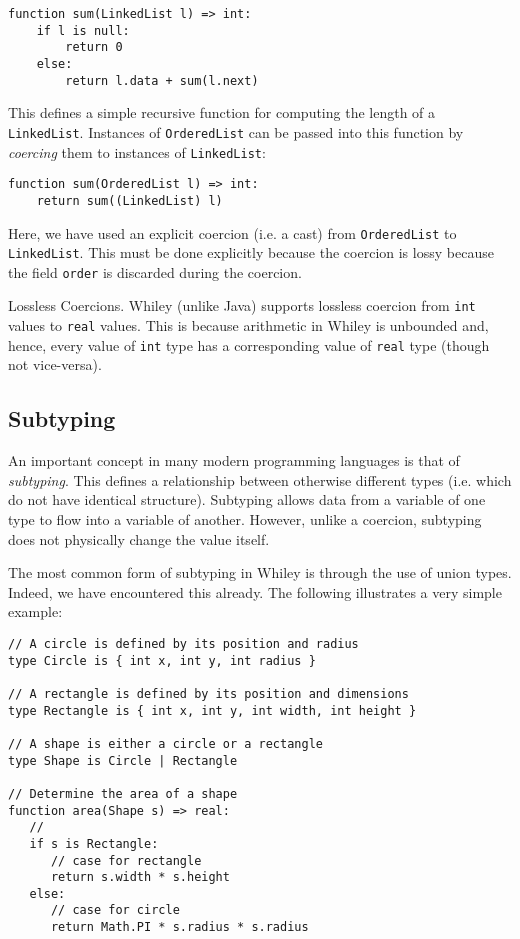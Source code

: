 \begin{lstlisting}
function sum(LinkedList l) => int:
    if l is null:
        return 0
    else:
        return l.data + sum(l.next)
\end{lstlisting}

This defines a simple recursive function for computing the length of a \lstinline{LinkedList}.  Instances of \lstinline{OrderedList} can be passed into this function by {\em coercing} them to instances of \lstinline{LinkedList}:

\begin{lstlisting}
function sum(OrderedList l) => int:
    return sum((LinkedList) l)
\end{lstlisting}

Here, we have used an explicit coercion (i.e. a cast) from \lstinline{OrderedList} to \lstinline{LinkedList}.  This must be done explicitly because the coercion is lossy because the field \lstinline{order} is discarded during the coercion.

\begin{insight}{Lossless Coercions.}
Whiley (unlike Java) supports lossless coercion from \lstinline{int} values to \lstinline{real} values.  This is because arithmetic in Whiley is unbounded and, hence, every value of \lstinline{int} type has a corresponding value of \lstinline{real} type (though not vice-versa).
\end{insight}

\subsection{Subtyping}

An important concept in many modern programming languages is that of {\em subtyping}.  This defines a relationship between otherwise different types (i.e. which do not have identical structure).  Subtyping allows data from a variable of one type to flow into a variable of another.  However, unlike a coercion, subtyping does not physically change the value itself.  

The most common form of subtyping in Whiley is through the use of union types.  Indeed, we have encountered this already.  The following illustrates a very simple example:

\begin{lstlisting}
// A circle is defined by its position and radius
type Circle is { int x, int y, int radius }

// A rectangle is defined by its position and dimensions
type Rectangle is { int x, int y, int width, int height }

// A shape is either a circle or a rectangle
type Shape is Circle | Rectangle

// Determine the area of a shape
function area(Shape s) => real:
   //
   if s is Rectangle:
      // case for rectangle
      return s.width * s.height
   else:
      // case for circle
      return Math.PI * s.radius * s.radius   
\end{lstlisting}

